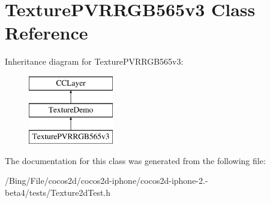 \hypertarget{interface_texture_p_v_r_r_g_b565v3}{\section{Texture\-P\-V\-R\-R\-G\-B565v3 Class Reference}
\label{interface_texture_p_v_r_r_g_b565v3}
}
Inheritance diagram for Texture\-P\-V\-R\-R\-G\-B565v3\-:\begin{figure}[H]
\begin{center}
\leavevmode
\includegraphics[height=3.000000cm]{interface_texture_p_v_r_r_g_b565v3}
\end{center}
\end{figure}


The documentation for this class was generated from the following file\-:\begin{DoxyCompactItemize}
\item 
/\-Bing/\-File/cocos2d/cocos2d-\/iphone/cocos2d-\/iphone-\/2.-\/beta4/tests/Texture2d\-Test.\-h\end{DoxyCompactItemize}

